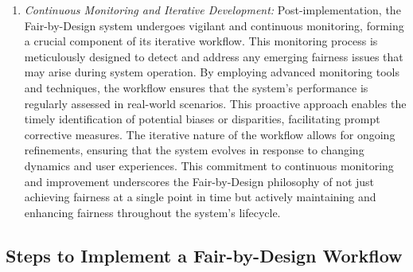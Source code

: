 \documentclass[12pt,a4paper,openright,twoside]{book}
\begin{document}
\begin{enumerate}
    \item \emph{Continuous Monitoring and Iterative Development:} Post-implementation, the Fair-by-Design system undergoes vigilant and continuous monitoring, forming a crucial component of its iterative workflow. This monitoring process is meticulously designed to detect and address any emerging fairness issues that may arise during system operation. By employing advanced monitoring tools and techniques, the workflow ensures that the system's performance is regularly assessed in real-world scenarios. This proactive approach enables the timely identification of potential biases or disparities, facilitating prompt corrective measures. The iterative nature of the workflow allows for ongoing refinements, ensuring that the system evolves in response to changing dynamics and user experiences. This commitment to continuous monitoring and improvement underscores the Fair-by-Design philosophy of not just achieving fairness at a single point in time but actively maintaining and enhancing fairness throughout the system's lifecycle.

\end{enumerate}

\subsection{Steps to Implement a Fair-by-Design Workflow}
\end{document}
